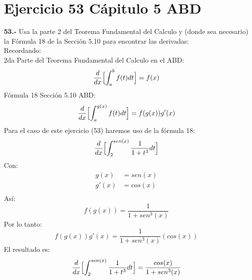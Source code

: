 \chapter*{Ejercicio 53 Cápitulo 5 ABD }

\textbf{53.-} Usa la parte 2 del Teorema Fundamental del Calculo y (donde sea necesario) la Fórmula 18 de la Sección 5.10 para encontrar las derivadas: \\
\newline
Recordando:\\
2da Parte del Teorema Fundamental del Calculo en el ABD:
\[
\frac{d}{dx}\Bigl[\int_{a}^{b}f(t)dt \Bigr] = f(x)
\]
Fórmula 18 Sección 5.10 ABD:
\[
\frac{d}{dx}\Bigl[\int_{a}^{g(x)}f(t)dt \Bigr] = f(g(x))g'(x)
\]
Para el caso de este ejercicio (53) haremos uso de la fórmula 18:
\[
\frac{d}{dx}\Bigl[\int_{2}^{sen(x)}\frac{1}{1+t^{3}}dt \Bigr] 
\]
Con:
\begin{align*}
    g(x) &= sen (x) \\
    g'(x) &= cos (x) \\
\end{align*}
Así:
\[
f(g(x)) = \frac{1}{1+sen^{3}(x)}
\]
Por lo tanto:
\[
f(g(x))g'(x) = \frac{1}{1+sen^{3}(x)}(cos (x))
\]
El resultado es:
\[
\frac{d}{dx}\Bigl[\int_{2}^{sen(x)}\frac{1}{1+t^{3}}dt \Bigr] = \frac{cos(x)}{1+sen^{3}(x)}
\]
